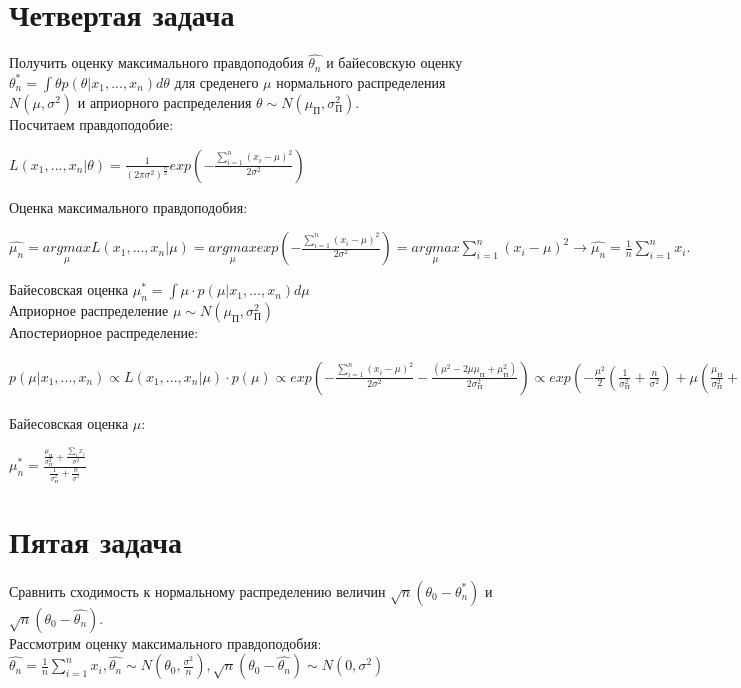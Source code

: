 \documentclass{article}
\begin{document}
\section{Четвертая задача}
Получить оценку максимального правдоподобия $\hat{\theta_n}$ и байесовскую оценку $\theta_n^{*} = \int \theta p(\theta|x_1,...,x_n)d\theta$ для среденего $\mu$ нормального распределения $N(\mu,\sigma^2)$ и априорного распределения $\theta \sim N(\mu_{\text{П}}, \sigma_{\text{П}}^2)$.\\
Посчитаем правдоподобие:
\begin{center}
$L(x_1,...,x_n|\theta) = \frac{1}{(2\pi \sigma^2)^{\frac{n}{2}}} exp(-\frac{\sum\limits_{i=1}^n (x_i - \mu)^2}{2\sigma^2})$
\end{center}
Оценка максимального правдоподобия:
\begin{center}
$\hat{\mu_n} = \underset{\mu}{argmax}L(x_1,...,x_n|\mu) = \underset{\mu}{argmax}exp(-\frac{\sum\limits_{i=1}^n (x_i - \mu)^2}{2\sigma^2}) = \underset{\mu}{argmax}\sum\limits_{i=1}^n (x_i - \mu)^2 \to \hat{\mu_n} = \frac{1}{n}\sum\limits_{i=1}^n x_i.$
\end{center}
Байесовская оценка $\mu_n^{*} = \int \mu \cdot p(\mu|x_1,...,x_n)d\mu$\\
Априорное распределение $\mu \sim N(\mu_{\text{П}},\sigma_{\text{П}}^2)$\\
Апостериорное распределение:
\begin{center}
$p(\mu|x_1,...,x_n) \propto L(x_1,...,x_n|\mu)\cdot p(\mu) \propto exp(-\frac{\sum\limits_{i=1}^n (x_i-\mu)^2}{2\sigma^2} - \frac{(\mu^2 - 2\mu\mu_{\text{П}} + \mu_{\text{П}}^2)}{2\sigma_{\text{П}}^2}) \propto exp(-\frac{\mu^2}{2}(\frac{1}{\sigma_{П}^2} + \frac{n}{\sigma^2}) + \mu(\frac{\mu_{П}}{\sigma_{П}^2} + \frac{\sum\limits_{i} x_i^2}{2\sigma^2})) = exp(-\frac{(\mu^2 - 2\mu\mu_n^{*} + \mu_n^{*2})}{2\sigma_n^{*2}}) = exp(-\frac{(\mu^2 - 2\mu\mu_{n}^{*} + \mu_n^{*2})}{2\sigma_n^{*2}}) = exp(-\frac{(\mu - \mu_n^{*})^2}{2\sigma_n^{*2}})$
\end{center}
Байесовская оценка $\mu$:
\begin{center}
$\mu_n^{*} = \frac{\frac{\mu_{\text{П}}}{\sigma_{\text{П}}^2} + \frac{\sum\limits_{i} x_i}{\sigma^2}}{\frac{1}{\sigma_{\text{П}}^2} + \frac{n}{\sigma^2}}$
\end{center}

\section{Пятая задача}
Сравнить сходимость к нормальному распределению величин $\sqrt{n}(\theta_0 - \theta_n^{*})$ и $\sqrt{n}(\theta_0 - \hat{\theta_n})$.\\
Рассмотрим оценку максимального правдоподобия:\\
$\hat{\theta_n} = \frac{1}{n}\sum\limits_{i=1}^n x_i, \hat{\theta_n} \sim N(\theta_0, \frac{\sigma^2}{n}), \sqrt{n}(\theta_0 - \hat{\theta_n}) \sim N(0, \sigma^2)$
\end{document}
